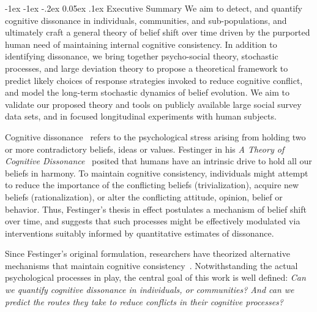\documentclass[onecolumn, compsoc,11pt]{IEEEtran}
\makeatletter
\renewcommand\section{\@startsection {section}{1}{\z@}%
                                   {-1ex \@plus -1ex \@minus -.2ex}%
                                   {0.05ex \@plus.1ex}%
                                   {\large\bfseries\scshape}}
\makeatother
\begin{document}
 
%
\lhead{}


\section{Executive Summary}
We aim to detect, and quantify cognitive dissonance in individuals, communities, and sub-populations, and ultimately craft a general theory of belief shift over time driven by  the purported  human need of maintaining internal cognitive consistency. In addition to identifying dissonance,  we bring together psycho-social theory, stochastic processes, and large deviation theory to propose a theoretical framework to  predict likely choices of  response strategies invoked   to reduce cognitive conflict, and model the long-term stochastic dynamics of belief evolution. We aim to validate our proposed theory and tools  on publicly available large  social survey data sets, and in focused longitudinal experiments with human subjects.

Cognitive dissonance~\cite{miller15} refers to  the psychological stress arising from holding two or more contradictory beliefs, ideas or values. Festinger in his \textit{A Theory of  Cognitive Dissonance}~\cite{festinger1962theory} posited that humans  have an intrinsic drive to hold all our beliefs in harmony. To maintain cognitive consistency, individuals might attempt to reduce the importance of the conflicting beliefs (trivialization), acquire new beliefs (rationalization), or alter  the conflicting attitude, opinion, belief or behavior. Thus, Festinger's thesis in effect postulates a mechanism of  belief shift over time, and suggests that such processes might be effectively modulated via interventions suitably  informed by  quantitative estimates of dissonance.

Since Festinger's original formulation, researchers have theorized alternative mechanisms that maintain cognitive consistency~\cite{ARONSON19691,zanna74,COOPER1984229}. Notwithstanding the actual psychological processes in play, the central goal of this work is
well defined: \textit{Can we quantify cognitive dissonance in individuals, or communities? And can we predict the routes they take to reduce conflicts in their cognitive processes?}

\end{document}
